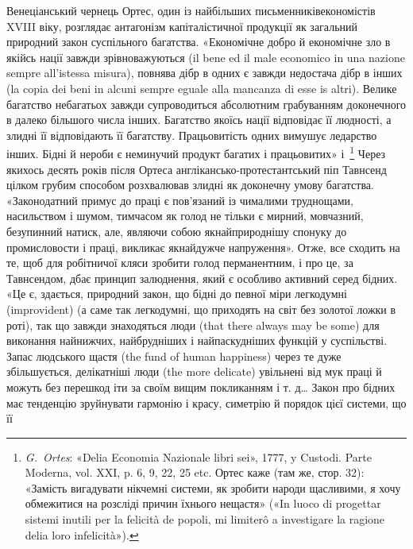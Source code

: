 Венеціанський чернець Ортес, один із найбільших письменників\dash{}економістів
XVIII віку, розглядає антагонізм капіталістичної
продукції як загальний природний закон суспільного
багатства. «Економічне добро й економічне зло в якійсь нації
завжди зрівноважуються (il bene ed il male economico in una
nazione sempre all’istessa misura), повнява дібр в одних є завжди
недостача дібр в інших (la copia dei beni in alcuni sempre eguale
alla mancanza di esse is altri). Велике багатство небагатьох завжди
супроводиться абсолютним грабуванням доконечного в далеко
більшого числа інших. Багатство якоїсь нації відповідає її людності,
а злидні її відповідають її багатству. Працьовитість одних
вимушує ледарство інших. Бідні й нероби є неминучий продукт
багатих і працьовитих» і~\footnote{
\emph{G.~Ortes}: «Delia Economia Nazionale libri sei», 1777, y Custodi.
Parte Moderna, vol. XXI, p. 6, 9, 22, 25 etc. Ортес каже (там же, стор. 32):
«Замість вигадувати нікчемні системи, як зробити народи щасливими,
я хочу обмежитися на розсліді причин їхнього нещастя» («In luoco di
progettar sistemi inutili per la felicità de popoli, mi limiterô a investigare
la ragione delia loro infelicità»).
} Через якихось десять років
після Ортеса англікансько-протестантський піп Тавнсенд цілком
грубим способом розхвалював злидні як доконечну умову
багатства. «Законодатний примус до праці є пов’язаний із чималими
труднощами, насильством і шумом, тимчасом як голод не
тільки є мирний, мовчазний, безупинний натиск, але, являючи
собою якнайприроднішу спонуку до промисловости і праці, викликає
якнайдужче напруження». Отже, все сходить на те, щоб
для робітничої кляси зробити голод перманентним, і про це, за
Тавнсендом, дбає принцип залюднення, який є особливо активний
серед бідних. «Це є, здається, природний закон, що бідні
до певної міри легкодумні (improvident) (а саме так легкодумні,
що приходять на світ без золотої ложки в роті), так що завжди
знаходяться люди (that there always may be some) для виконання
найнижчих, найбрудніших і найпаскудніших функцій у суспільстві.
Запас людського щастя (the fund of human happiness) через
те дуже збільшується, делікатніші люди (the more delicate) увільнені
від мук праці й можуть без перешкод іти за своїм вищим
покликанням і т. д\dots{} Закон про бідних має тенденцію зруйнувати
гармонію і красу, симетрію й порядок цієї системи, що її
\parbreak{}  %
